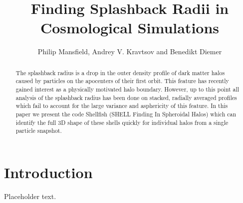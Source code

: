 \documentclass[numberedappendix,apj]{emulateapj}
\begin{document}


\title{Finding Splashback Radii in Cosmological Simulations}

\author{Philip Mansfield, Andrey V. Kravtsov and Benedikt Diemer}




\begin{abstract}

The splashback radius is a drop in the outer density profile of dark matter
halos caused by particles on the apocenters of their first orbit.
This feature has recently gained interest as a physically motivated halo
boundary. However, up to this point all analysis of the splashback radius has
been done on stacked, radially averaged profiles which fail to account for the
large variance and asphericity of this feature. In this paper we present the
code Shellfish (SHELL Finding In Spheroidal Halos) which can identify the full
3D shape of these shells quickly for individual halos from a single particle
snapshot.

\end{abstract} 

\section{Introduction}
\label{sec:introduction}

Placeholder text.
\end{document}
